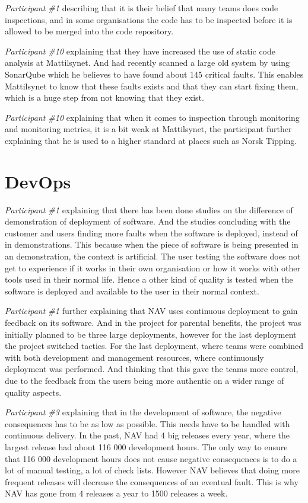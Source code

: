 \textit{Participant \#1} describing that it is their belief that many teams does code inspections, and in some organisations the code has to be inspected before it is allowed to be merged into the code repository.

\textit{Participant \#10} explaining that they have increased the use of static code analysis at Mattilsynet. And had recently scanned a large old system by using SonarQube which he believes to have found about 145 critical faults. This enables Mattilsynet to know that these faults exists and that they can start fixing them, which is a huge step from not knowing that they exist. 

\textit{Participant \#10} explaining that when it comes to inspection through monitoring and monitoring metrics, it is a bit weak at Mattilsynet, the participant further explaining that he is used to a higher standard at places such as Norsk Tipping.

\section{DevOps}
\textit{Participant \#1} explaining that there has been done studies on the difference of demonstration of deployment of software. And the studies concluding with the customer and users finding more faults when the software is deployed, instead of in demonstrations. This because when the piece of software is being presented in an demonstration, the context is artificial. The user testing the software does not get to experience if it works in their own organisation or how it works with other tools used in their normal life. Hence a other kind of quality is tested when the software is deployed and available to the user in their normal context.

\textit{Participant \#1} further explaining that NAV uses continuous deployment to gain feedback on its software. And in the project for parental benefits, the project was initially planned to be three large deployments, however for the last deployment the project switched tactics. For the last deployment, where teams were combined with both development and management resources, where continuously deployment was performed. And thinking that this gave the teams more control, due to the feedback from the users being more authentic on a wider range of quality aspects.

\textit{Participant \#3} explaining that in the development of software, the negative consequences has to be as low as possible. This needs have to be handled with continuous delivery. In the past, NAV had 4 big releases every year, where the largest release had about 116 000 development hours. The only way to ensure that 116 000 development hours does not cause negative consequences is to do 
 a lot of manual testing, a lot of check lists. However NAV believes that doing more frequent releases will decrease the consequences of an eventual fault. This is why NAV has gone from 4 releases a year to 1500 releases a week.

